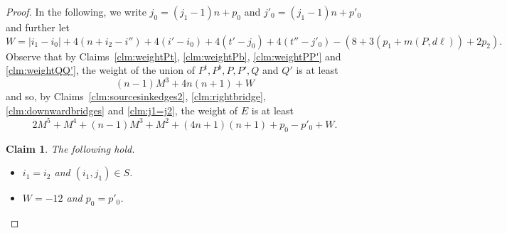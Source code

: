\documentclass[a4paper,11pt]{article}
\theoremstyle{plain}
\newtheorem{claim}[theorem]{Claim}
\newtheorem{identification rule}{Identification Rule}
\theoremstyle{definition}
\theoremstyle{remark}
\begin{document}
\begin{proof}
\noindent
In the following, we write $j_0 = (j_1-1)n+p_0$ and $j'_0 = (j_1-1)n+p'_0$ and further let 
\[
W = |i_1-i_0| + 4(n+i_2-i'') + 4(i'-i_0) + 4(t'-j_0) + 4(t''-j'_0) - (8 + 3(p_1 + m(P,d\ell)) + 2p_2).
\]
Observe that by Claims~\ref{clm:weightPt}, \ref{clm:weightPb}, \ref{clm:weightPP'} and \ref{clm:weightQQ'}, the weight of the union of $P^t,P^b,P,P',Q$ and $Q'$ is at least
\[
(n-1)M^3 + 4n(n+1) + W
\]
and so, by Claims~\ref{clm:sourcesinkedges2}, \ref{clm:rightbridge}, \ref{clm:downwardbridges} and \ref{clm:j1=j2}, the weight of $E$ is at least
\begin{equation}
\label{eq:weightE}
2M^5 + M^4 + (n-1)M^3 + M^2 + (4n+1)(n+1) + p_0 - p'_0 + W.
\end{equation}

\begin{claim}
\label{clm:i1=i2}
The following hold.
\begin{itemize}
\item[(1)] $i_1 = i_2$ and $(i_1,j_1) \in S$. 
\item[(2)] $W=-12$ and $p_0=p'_0$.
\end{itemize}
\end{claim}


\end{proof}
\end{document}
